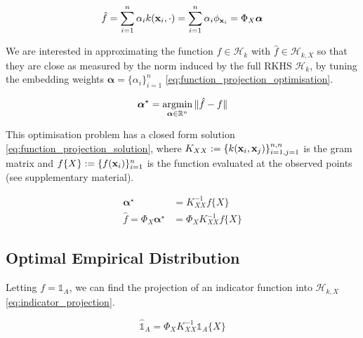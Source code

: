 \documentclass[twoside]{article} \usepackage{aistats2017}
\theoremstyle{definition}
\theoremstyle{remark}
\newcommand{\argmin}{\operatornamewithlimits{argmin}}
\newcommand{\ds}[1]{{#1}}
\begin{document}
		\begin{equation}
			\hat{f} = \sum_{i = 1}^{n} \alpha_{i} k(\bvec{x}_{i}, \cdot) = \sum_{i = 1}^{n} \alpha_{i} \phi_{\bvec{x}_{i}} = \Phi_{\ds{X}} \bm{\alpha}
		\label{eq:function_projection}
		\end{equation}
	
		We are interested in approximating the function $f \in \mathcal{H}_{k}$ with $\hat{f} \in \mathcal{H}_{k, \ds{X}}$ so that they are close as measured by the norm induced by the full RKHS $\mathcal{H}_{k}$, by tuning the embedding weights $\bm{\alpha} = \{\alpha_{i}\}_{i = 1}^{n}$ \eqref{eq:function_projection_optimisation}.
			
		\begin{equation}
			\bm{\alpha}^{\star} = \argmin_{\bm{\alpha} \in \mathbb{R}^{n}} \Vert \hat{f} - f \Vert
		\label{eq:function_projection_optimisation}
		\end{equation}
		
		This optimisation problem has a closed form solution \eqref{eq:function_projection_solution}, where $K_{\ds{X} \ds{X}} := \{k(\bvec{x}_{i}, \bvec{x}_{j})\}_{i = 1, j = 1}^{n, n}$ is the gram matrix and $f\{\ds{X}\} := \{f(\bvec{x}_{i})\}_{i = 1}^{n}$ is the function evaluated at the observed points (see supplementary material).
		
		\begin{equation}
			\begin{aligned}
				\bm{\alpha}^{\star} &= K_{\ds{X} \ds{X}}^{-1} f\{\ds{X}\} \\
				\hat{f} = \Phi_{\ds{X}} \bm{\alpha}^{\star} &= \Phi_{\ds{X}} K_{\ds{X} \ds{X}}^{-1} f\{\ds{X}\}
			\end{aligned}
		\label{eq:function_projection_solution}
		\end{equation}
		
	\subsection{Optimal Empirical Distribution}
	\label{sec:discriminative_quantile_regression:optimal_empirical_distribution}
	
		Letting $f = \mathbb{1}_{A}$, we can find the projection of an indicator function into $\mathcal{H}_{k, \ds{X}}$ \eqref{eq:indicator_projection}.
		
		\begin{equation}
			\hat{\mathbb{1}}_{A} = \Phi_{\ds{X}} K_{\ds{X} \ds{X}}^{-1} \mathbb{1}_{A}\{\ds{X}\}
		\label{eq:indicator_projection}
		\end{equation}
		
\end{document}
